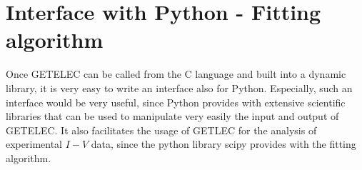 \documentclass[notitlepage
]{revtex4-1}
\begin{document}
\section{Interface with Python - Fitting algorithm}
\label{sec:Python}

Once GETELEC can be called from the C language and built into a dynamic library, it is very easy to write an interface also for Python. Especially, such an interface would be very useful, since Python provides with extensive scientific libraries that can be used to manipulate very easily the input and output of GETELEC. It also facilitates the usage of GETLEC for the analysis of experimental $I-V$ data, since the python library scipy provides with the fitting algorithm.



%
\end{document}
